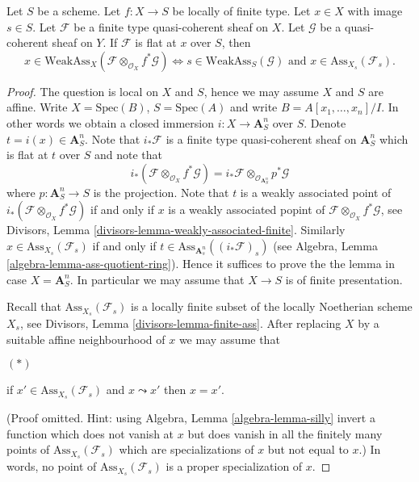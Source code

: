 \begin{lemma}
\label{lemma-bourbaki-finite-type-general-base-at-point}
Let $S$ be a scheme.
Let $f : X \to S$ be locally of finite type.
Let $x \in X$ with image $s \in S$.
Let $\mathcal{F}$ be a finite type quasi-coherent sheaf on $X$.
Let $\mathcal{G}$ be a quasi-coherent sheaf on $Y$.
If $\mathcal{F}$ is flat at $x$ over $S$, then
$$
x \in \text{WeakAss}_X(\mathcal{F} \otimes_{\mathcal{O}_X} f^*\mathcal{G})
\Leftrightarrow
s \in \text{WeakAss}_S(\mathcal{G})
\text{ and }
x \in \text{Ass}_{X_s}(\mathcal{F}_s).
$$
\end{lemma}

\begin{proof}
The question is local on $X$ and $S$, hence we may assume $X$ and $S$
are affine. Write $X = \text{Spec}(B)$, $S = \text{Spec}(A)$ and write
$B = A[x_1, \ldots, x_n]/I$. In other words we obtain a closed immersion
$i : X \to \mathbf{A}^n_S$ over $S$. Denote $t = i(x) \in \mathbf{A}^n_S$.
Note that $i_*\mathcal{F}$ is a finite type quasi-coherent sheaf on
$\mathbf{A}^n_S$ which is flat at $t$ over $S$ and note that
$$
i_*(\mathcal{F} \otimes_{\mathcal{O}_X} f^*\mathcal{G}) =
i_*\mathcal{F} \otimes_{\mathcal{O}_{\mathbf{A}^n_S}} p^*\mathcal{G}
$$
where $p : \mathbf{A}^n_S \to S$ is the projection. Note that
$t$ is a weakly associated point of
$i_*(\mathcal{F} \otimes_{\mathcal{O}_X} f^*\mathcal{G})$
if and only if $x$ is a weakly associated popint of
$\mathcal{F} \otimes_{\mathcal{O}_X} f^*\mathcal{G}$, see
Divisors, Lemma \ref{divisors-lemma-weakly-associated-finite}.
Similarly $x \in \text{Ass}_{X_s}(\mathcal{F}_s)$ if and only
if $t \in \text{Ass}_{\mathbf{A}^n_s}((i_*\mathcal{F})_s)$ (see
Algebra, Lemma \ref{algebra-lemma-ass-quotient-ring}).
Hence it suffices to prove the the lemma in case $X = \mathbf{A}^n_S$.
In particular we may assume that $X \to S$ is of finite presentation.

\medskip\noindent
Recall that $\text{Ass}_{X_s}(\mathcal{F}_s)$ is a locally finite subset
of the locally Noetherian scheme $X_s$, see
Divisors, Lemma \ref{divisors-lemma-finite-ass}.
After replacing $X$ by a suitable affine neighbourhood of $x$ we may
assume that
\begin{list}{$(*)$}{}
\item if $x' \in \text{Ass}_{X_s}(\mathcal{F}_s)$ and $x \leadsto x'$
then $x = x'$.
\end{list}
(Proof omitted. Hint: using
Algebra, Lemma \ref{algebra-lemma-silly}
invert a function which does not vanish at $x$ but does vanish
in all the finitely many points of $\text{Ass}_{X_s}(\mathcal{F}_s)$
which are specializations of $x$ but not equal to $x$.)
In words, no point of $\text{Ass}_{X_s}(\mathcal{F}_s)$
is a proper specialization of $x$.


\end{proof}

